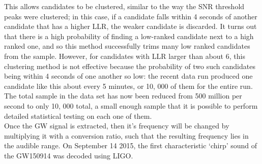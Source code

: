 This allows candidates to be clustered, similar to the way the SNR threshold peaks were clustered; in this case, if a candidate falls within 4 seconds of another candidate that has a higher LLR, the weaker candidate is discarded. It turns out that there is a high probability of finding a low-ranked candidate next to a high ranked one, and so this method successfully trims many low ranked candidates from the sample. However, for candidates with LLR larger than about 6, this clustering method is not effective because the probability of two such candidates being within 4 seconds of one another so low: the recent data run produced one candidate like this about every 5 minutes, or 10, 000 of them for the entire run. The total sample in the data set has now been reduced from 500 million per second to only 10, 000 total, a small enough sample that it is possible to perform detailed statistical testing on each one of them.\\

Once the GW signal is extracted, then it's frequency will be changed by multiplying it with a conversion ratio, such that the resulting frequency lies in the audible range. On September 14 2015, the first characteristic `chirp' sound of the GW150914 was decoded using LIGO. 

\pagbreak
